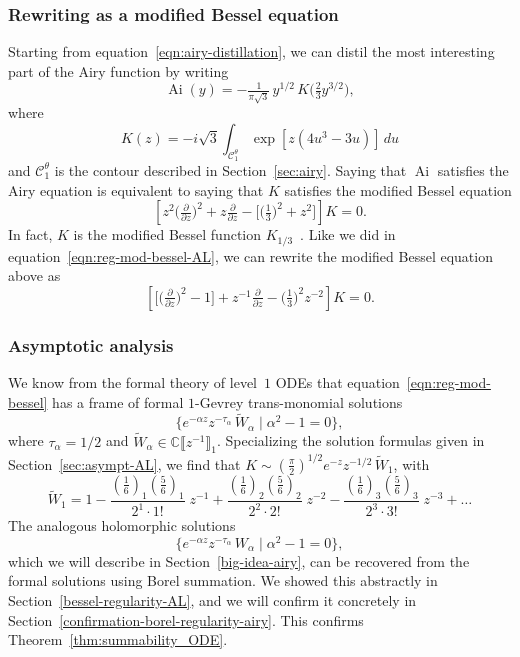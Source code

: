 \documentclass{article}
\newcommand{\C}{\mathbb{C}}
\newcommand{\series}[1]{\tilde{#1}}
\DeclareMathOperator{\Ai}{Ai}
\theoremstyle{definition}
\theoremstyle{plain}
\begin{document}
\subsubsection{Rewriting as a modified Bessel equation}
Starting from equation~\eqref{eqn:airy-distillation}, we can distil the most interesting part of the Airy function by writing
\[ \Ai(y) = -\tfrac{1}{\pi\sqrt{3}}\,y^{1/2}\,K\big(\tfrac{2}{3} y^{3/2}\big), \]
where
\begin{equation}\label{integral:mod-bessel-airy}
K(z) = -i\sqrt{3} \int_{\mathcal{C}^\theta_1} \exp\left[z \left(4u^3 - 3u\right)\right]\,du
\end{equation}
and $\mathcal{C}^\theta_1$ is the contour described in Section~\ref{sec:airy}. Saying that $\Ai$ satisfies the Airy equation is equivalent to saying that $K$ satisfies the modified Bessel equation
\begin{equation}\label{eqn:mod-bessel-1/3}
\left[z^2 \big(\tfrac{\partial}{\partial z}\big)^2 + z \tfrac{\partial}{\partial z} - \big[\big(\tfrac{1}{3}\big)^2 + z^2\big]\right] K = 0.
\end{equation}
In fact, $K$ is the modified Bessel function $K_{1/3}$~\cite[equation~9.6.1]{dlmf}. Like we did in equation~\eqref{eqn:reg-mod-bessel-AL}, we can rewrite the modified Bessel equation above as 
\begin{equation}\label{eqn:reg-mod-bessel}
\left[ \big[ \big(\tfrac{\partial}{\partial z}\big)^2 - 1 \big] + z^{-1} \tfrac{\partial}{\partial z} - \big(\tfrac{1}{3}\big)^2 z^{-2} \right] K = 0.
\end{equation}
%
\subsubsection{Asymptotic analysis}\label{sec:asympt-airy}
%
We know from the formal theory of level~$1$ ODEs that equation~\eqref{eqn:reg-mod-bessel} has a frame of formal $1$-Gevrey trans-monomial solutions
\[ \{ e^{-\alpha z} z^{-\tau_\alpha}\,\series{W}_\alpha \mid \alpha^2 - 1 = 0 \}, \]
where $\tau_\alpha = 1/2$ and $\series{W}_\alpha\in\C\llbracket z^{-1} \rrbracket_1$. Specializing the solution formulas given in Section~\ref{sec:asympt-AL}, we find that $K \sim \left(\tfrac{\pi}{2}\right)^{1/2} e^{-z} z^{-1/2}\,\series{W}_1$, with
\begin{equation}\label{bessel-asymp}
\series{W}_1 = 1 - \frac{(\tfrac{1}{6})_1 (\tfrac{5}{6})_1}{2^1 \cdot 1!}\;z^{-1} + \frac{(\tfrac{1}{6})_2 (\tfrac{5}{6})_2}{2^2 \cdot 2!}\;z^{-2} - \frac{(\tfrac{1}{6})_3 (\tfrac{5}{6})_3}{2^3 \cdot 3!}\;z^{-3} + \ldots
\end{equation}
%
The analogous holomorphic solutions
\[ \{ e^{-\alpha z} z^{-\tau_\alpha}\,W_\alpha \mid \alpha^2 - 1 = 0 \}, \]
which we will describe in Section~\ref{big-idea-airy}, can be recovered from the formal solutions using Borel summation. We showed this abstractly in Section~\ref{bessel-regularity-AL}, and we will confirm it concretely in Section~\ref{confirmation-borel-regularity-airy}. This confirms Theorem~\ref{thm:summability_ODE}.
%
\end{document}

